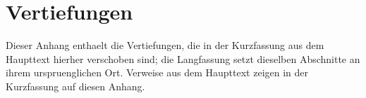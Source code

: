\chapter{Vertiefungen}\label{app:vertiefungen}
Dieser Anhang enthaelt die Vertiefungen, die in der Kurzfassung aus dem Haupttext hierher verschoben sind; die Langfassung setzt dieselben Abschnitte an ihrem urspruenglichen Ort. Verweise aus dem Haupttext zeigen in der Kurzfassung auf diesen Anhang.
